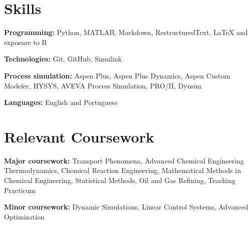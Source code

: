 \documentclass[letterpaper,11pt]{article}
\newcommand{\resumeSubHeadingListStart}{\begin{itemize}[leftmargin=0.15in, label={}]}
\newcommand{\resumeSubHeadingListEnd}{\end{itemize}}
\begin{document}
\section{Skills}
  \vspace{2pt}
  \resumeSubHeadingListStart
    \small{\item{
        \textbf{Programming:}{ Python, MATLAB, Markdown, RestructuredText, LaTeX and exposure to R} \\ \vspace{3pt}
        
        \textbf{Technologies:}{ Git, GitHub, Simulink} \\ \vspace{3pt}

        \textbf{Process simulation:}{ Aspen Plus, Aspen Plus Dynamics, Aspen Custom Modeler, HYSYS, AVEVA Process Simulation, PRO/II, Dynsim} \\ \vspace{3pt}
        
        \textbf{Languages:}{ English and Portuguese}
        
    }}
  \resumeSubHeadingListEnd


\setlength{\bibhang}{3pt}
{\list
	{}
	{\setlength{\leftmargin}{\bibhang}%
		\setlength{\itemindent}{-\leftmargin}%
		\setlength{\itemsep}{\bibitemsep}%
		\setlength{\parsep}{\bibparsep}}}
{\endlist}
{\item}
\nocite{*}
\printbibliography[env = bibliography, title= Selected Research Publications]


\section{Relevant Coursework}
  \vspace{2pt}
  \resumeSubHeadingListStart
    \small{\item{
        \textbf{Major coursework:}{ Transport Phenomena, Advanced Chemical Engineering Thermodynamics, Chemical Reaction Engineering, Mathematical Methods in Chemical Engineering, Statistical Methods, Oil and Gas Refining, Teaching Practicum} \\ \vspace{3pt}
        
        \textbf{Minor coursework:}{ Dynamic Simulations, Linear Control Systems, Advanced Optimization}
    }}
  \resumeSubHeadingListEnd
\end{document}
